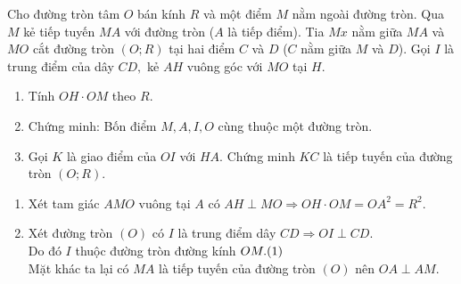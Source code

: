 \begin{bt}
	Cho đường tròn tâm $O$ bán kính $R$ và một điểm $M$ nằm ngoài đường tròn. Qua $M$ kẻ tiếp tuyến $MA$ với đường tròn ($A$ là tiếp điểm). Tia $Mx$ nằm giữa $MA$ và $MO$ cắt đường tròn $(O; R)$ tại hai điểm $C$ và $D$ ($C$ nằm giữa $M$ và $D$). Gọi $I$ là trung điểm của dây $CD,$ kẻ $AH$ vuông góc với $MO$ tại $H.$ 
	\begin{enumerate}
		\item Tính $OH\cdot OM $ theo $R. $
		\item Chứng minh: Bốn điểm $M, A, I, O $ cùng thuộc một đường tròn. 
		\item Gọi $K$ là giao điểm của $OI$ với $HA.$ Chứng minh $KC$ là tiếp tuyến của đường tròn $(O; R).$
	\end{enumerate}
	\loigiai
	{
		\begin{center}
		\end{center}
		\begin{enumerate}
			\item Xét tam giác $AMO $ vuông tại $A$ có $AH \perp  MO \Rightarrow OH\cdot OM = OA^2 = R^2. $
			\item Xét đường tròn $(O) $ có $I$ là trung điểm dây $CD \Rightarrow OI \perp CD. $\\
			Do đó $ I $ thuộc đường tròn đường kính $ OM.\hfill(1)$ \\
			Mặt khác ta lại có $ MA $ là tiếp tuyến của đường tròn $ (O) $ nên $ OA \perp AM. $\\

\end{enumerate}}
\end{bt}
